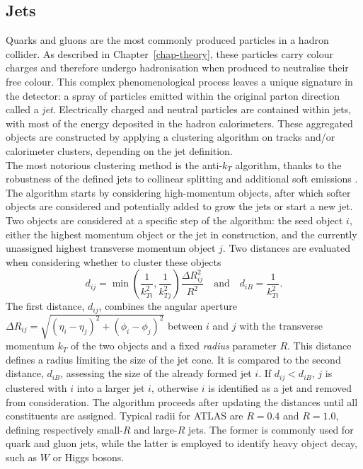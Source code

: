 \subsection{Jets}\label{sec-atlas-jets}
Quarks and gluons are the most commonly produced particles in a hadron collider. As described in Chapter~\ref{chap-theory}, these particles carry colour charges and therefore undergo hadronisation when produced to neutralise their free colour. This complex phenomenological process leaves a unique signature in the detector: a spray of particles emitted within the original parton direction called a \textit{jet}. Electrically charged and neutral particles are contained within jets, with most of the energy deposited in the hadron calorimeters. These aggregated objects are constructed by applying a clustering algorithm on tracks and/or calorimeter clusters, depending on the jet definition. \\ 

The most notorious clustering method is the anti-$k_T$ algorithm, thanks to the robustness of the defined jets to collinear splitting and additional soft emissions \cite{Cacciari:2008gp}. The algorithm starts by considering high-momentum objects, after which softer objects are considered and potentially added to grow the jets or start a new jet. Two objects are considered at a specific step of the algorithm: the seed object $i$, either the highest momentum object or the jet in construction, and the currently unassigned highest transverse momentum object $j$. Two distances are evaluated when considering whether to cluster these objects
\begin{equation}
  d_{ij} = \min\left(\frac{1}{k_{Ti}^2}, \frac{1}{k_{Tj}^2} \right) \frac{\Delta R_{ij}^2}{R^2} \quad \text{and} \quad d_{iB} = \frac{1}{k_{Ti}^2}.
\end{equation}
The first distance, $d_{ij}$, combines the angular aperture $\Delta R_{ij} = \sqrt{(\eta_i - \eta_j)^2 + (\phi_i - \phi_j)^2}$ between $i$ and $j$ with the transverse momentum $k_T$ of the two objects and a fixed \textit{radius} parameter $R$. This distance defines a radius limiting the size of the jet cone. It is compared to the second distance, $d_{iB}$, assessing the size of the already formed jet $i$. If $d_{ij} < d_{iB}$, $j$ is clustered with $i$ into a larger jet $i$, otherwise $i$ is identified as a jet and removed from consideration. The algorithm proceeds after updating the distances until all constituents are assigned. Typical radii for ATLAS are $R = 0.4$ and $R=1.0$, defining respectively small-$R$ and large-$R$ jets. The former is commonly used for quark and gluon jets, while the latter is employed to identify heavy object decay, such as $W$ or Higgs bosons. \\

